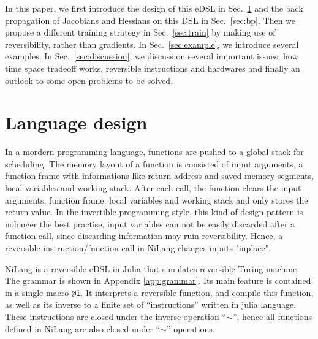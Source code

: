 \documentclass[aps,twocolumn,longbibliography,english,superscriptaddress,prr]{revtex4-1}
\newcommand{\<}{\langle}
\renewcommand{\>}{\rangle}
\newcommand{\Sec}[1]{Sec.~\ref{#1}}
\newcommand{\App}[1]{Appendix \ref{#1}}
\theoremstyle{definition}\newtheorem{definition}{\textit{Definition}}
\begin{document}
    In this paper, we first introduce the design of this eDSL in \Sec{sec:lang} and the back propagation of Jacobians and Hessians on this DSL in \Sec{sec:bp}.
    Then we propose a different training strategy in \Sec{sec:train} by making use of reversibility, rather than gradients.
    In \Sec{sec:example}, we introduce several examples.
    In \Sec{sec:discussion}, we discuss on several important issues, how time space tradeoff works, reversible instructions and hardwares and finally an outlook to some open problems to be solved.

    \section{Language design}\label{sec:lang}
In a mordern programming language, functions are pushed to a global stack for scheduling. The memory layout of a function is consisted of input arguments, a function frame with informations like return address and saved memory segments, local variables and working stack. After each call, the function clears the input arguments, function frame, local variables and working stack and only stores the return value.
In the invertible programming style, this kind of design pattern is nolonger the best practise, input variables can not be easily discarded after a function call, since discarding information may ruin reversibility. Hence, a reversible instruction/function call in NiLang changes inputs "inplace".

NiLang is a reversible eDSL in Julia that simulates reversible Turing machine. The grammar is shown in \App{app:grammar}.
Its main feature is contained in a single macro \texttt{@i}. It interprets a reversible function, and compile this function, as well as its inverse to a finite set of ``instructions'' written in julia language. These instructions are closed under the inverse operation ``$\sim$'', hence all functions defined in NiLang are also closed under ``$\sim$'' operations.
\end{document}
